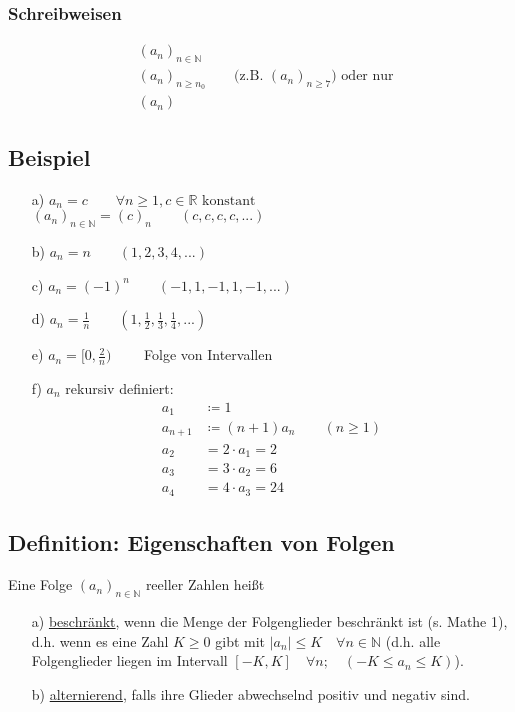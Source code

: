 \documentclass[12pt, titlepage]{article}
\newcommand{\R}{\mathds{R}}
\newcommand{\N}{\mathds{N}}
\renewcommand{\*}{\cdot}
\begin{document}
	\subsubsection*{Schreibweisen}
	\begin{align*}
		&(a_n)_{n\in\N}\\
		&(a_n)_{n\geq n_0}\qquad \textrm{(z.B. $(a_n)_{n\geq 7}$) oder nur}\\
		&(a_n)
	\end{align*}
	\subsection{Beispiel}
	\begin{itemize}
		\item[a)] $a_n=c\qquad\forall n\geq 1, c\in\R\textrm{ konstant}$\\
		$(a_n)_{n\in\N}=(c)_n\qquad (c,c,c,c,...)$
		\item[b)] $a_n=n\qquad (1, 2, 3,4,...)$
		\item[c)] $a_n=(-1)^n\qquad (-1,1,-1,1,-1,...)$
		\item[d)] $a_n=\frac{1}{n}\qquad(1,\frac{1}{2},\frac{1}{3},\frac{1}{4},...)$
		\item[e)] $a_n=[0,\frac{2}{n})\qquad$ Folge von Intervallen
		\item[f)] $a_n$ rekursiv definiert:\\
		\begin{align*}
			a_1&\coloneqq 1\\
			a_{n+1}&\coloneqq(n+1)a_n\qquad(n\geq 1)\\
			a_2&=2\*a_1=2\\
			a_3&=3\*a_2=6\\
			a_4&=4\*a_3=24
		\end{align*}
	\end{itemize}
	\subsection{Definition: Eigenschaften von Folgen}
	Eine Folge $(a_n)_{n\in\N}$ reeller Zahlen heißt
	\begin{itemize}
		\item[a)] \underline{beschränkt}, wenn die Menge der Folgenglieder beschränkt ist (s. Mathe 1), d.h. wenn es eine Zahl $K\geq 0$ gibt mit $|a_n|\leq K\quad\forall n\in\N$ (d.h. alle Folgenglieder liegen im Intervall $[-K,K]\quad\forall n;\quad(-K\leq a_n\leq K)$).
		\item[b)] \underline{alternierend}, falls ihre Glieder abwechselnd positiv und negativ sind.
	\end{itemize}
\end{document}
